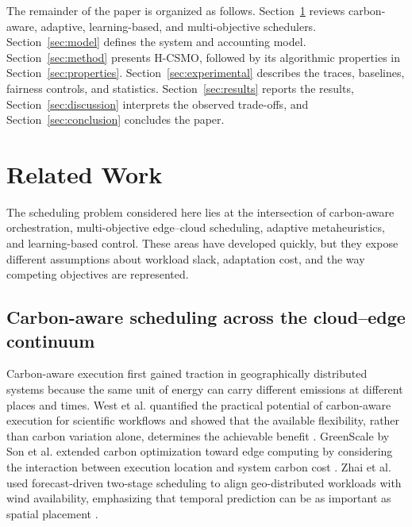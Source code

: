 \documentclass[preprint,12pt]{elsarticle}
\newcommand{\method}{H-CSMO\xspace}
\begin{document}
The remainder of the paper is organized as follows. Section~\ref{sec:related} reviews carbon-aware, adaptive, learning-based, and multi-objective schedulers. Section~\ref{sec:model} defines the system and accounting model. Section~\ref{sec:method} presents \method, followed by its algorithmic properties in Section~\ref{sec:properties}. Section~\ref{sec:experimental} describes the traces, baselines, fairness controls, and statistics. Section~\ref{sec:results} reports the results, Section~\ref{sec:discussion} interprets the observed trade-offs, and Section~\ref{sec:conclusion} concludes the paper.
\section{Related Work}
\label{sec:related}

The scheduling problem considered here lies at the intersection of carbon-aware orchestration, multi-objective edge--cloud scheduling, adaptive metaheuristics, and learning-based control. These areas have developed quickly, but they expose different assumptions about workload slack, adaptation cost, and the way competing objectives are represented.

\subsection{Carbon-aware scheduling across the cloud--edge continuum}

Carbon-aware execution first gained traction in geographically distributed systems because the same unit of energy can carry different emissions at different places and times. West et al. quantified the practical potential of carbon-aware execution for scientific workflows and showed that the available flexibility, rather than carbon variation alone, determines the achievable benefit \cite{West2026CarbonAwareWorkflows}. GreenScale by Son et al. extended carbon optimization toward edge computing by considering the interaction between execution location and system carbon cost \cite{son2025greenscale}. Zhai et al. used forecast-driven two-stage scheduling to align geo-distributed workloads with wind availability, emphasizing that temporal prediction can be as important as spatial placement \cite{zhai2025forecast}.
\end{document}
